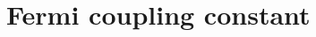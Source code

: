 \hypertarget{group___fermi_coupling}{}\section{Fermi coupling constant}
\label{group___fermi_coupling}

